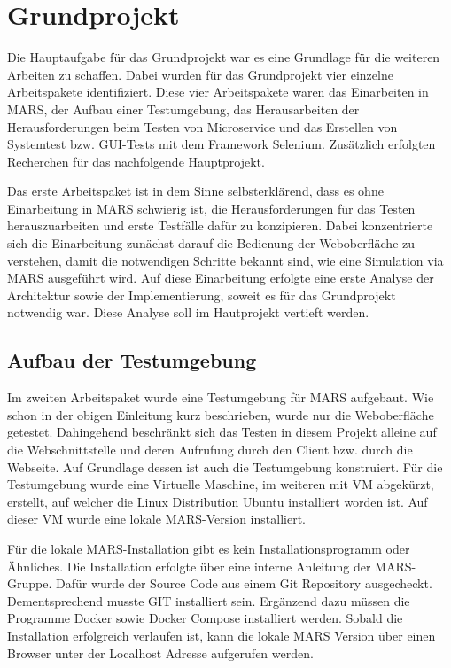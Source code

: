 \documentclass{llncs}
\begin{document}
\section{Grundprojekt}
Die Hauptaufgabe für das Grundprojekt war es eine Grundlage für die weiteren Arbeiten zu schaffen. Dabei wurden für das Grundprojekt vier einzelne Arbeitspakete identifiziert. Diese vier Arbeitspakete waren das Einarbeiten in MARS, der Aufbau einer Testumgebung, das Herausarbeiten der Herausforderungen beim Testen von Microservice und das Erstellen von Systemtest bzw. GUI-Tests mit dem Framework Selenium. Zusätzlich erfolgten Recherchen für das nachfolgende Hauptprojekt.

Das erste Arbeitspaket ist in dem Sinne selbsterklärend, dass es ohne Einarbeitung in MARS schwierig ist, die Herausforderungen für das Testen herauszuarbeiten und erste Testfälle dafür zu konzipieren. Dabei konzentrierte sich die Einarbeitung zunächst darauf die Bedienung der Weboberfläche zu verstehen, damit die notwendigen Schritte bekannt sind, wie eine Simulation via MARS ausgeführt wird. Auf diese Einarbeitung erfolgte eine erste Analyse der Architektur sowie der Implementierung, soweit es für das Grundprojekt notwendig war. Diese Analyse soll im Hautprojekt vertieft werden.

\subsection{Aufbau der Testumgebung}
Im zweiten Arbeitspaket wurde eine Testumgebung für MARS aufgebaut. Wie schon in der obigen Einleitung kurz beschrieben, wurde nur die Weboberfläche getestet. Dahingehend beschränkt sich das Testen in diesem Projekt alleine auf die Webschnittstelle und deren Aufrufung durch den Client bzw. durch die Webseite. Auf Grundlage dessen ist auch die Testumgebung konstruiert. Für die Testumgebung wurde eine Virtuelle Maschine, im weiteren mit VM abgekürzt, erstellt, auf welcher die Linux Distribution Ubuntu installiert worden ist. Auf dieser VM wurde eine lokale MARS-Version installiert.

Für die lokale MARS-Installation gibt es kein Installationsprogramm oder Ähnliches. Die Installation erfolgte über eine interne Anleitung der MARS-Gruppe. Dafür wurde der Source Code aus einem Git Repository ausgecheckt. Dementsprechend musste GIT installiert sein. Ergänzend dazu müssen die Programme Docker sowie Docker Compose installiert werden. Sobald die Installation erfolgreich verlaufen ist, kann die lokale MARS Version über einen Browser unter der Localhost Adresse aufgerufen werden. 
\end{document}

